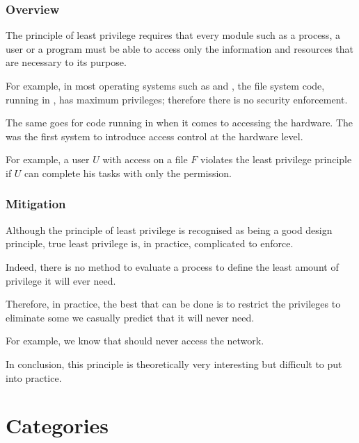 \begin{frame}
  \frametitle{Overview}

  The principle of least privilege requires that every module such as a
  process, a user or a program must be able to access only the information
  and resources that are necessary to its purpose.

  \-

  For example, in most operating systems such as  and
  , the file system code, running in , has
  maximum privileges; therefore there is no security enforcement.

  \-

  The same goes for code running in  when it comes to
  accessing the hardware. The  was the first system
  to introduce access control at the hardware level.

  \-

  For example, a user $U$ with  access on a file
  $F$ violates the least privilege principle if $U$ can complete his
  tasks with only the  permission.
\end{frame}


\begin{frame}
  \frametitle{Mitigation}

  Although the principle of least privilege is recognised as being a
  good design principle, true least privilege is, in practice, complicated
  to enforce.

  \-

  Indeed, there is no method to evaluate a process to define the least
  amount of privilege it will ever need.

  \-

  Therefore, in practice, the best that can be done is to restrict the
  privileges to eliminate some we casually predict that it will never need.

  \-

  For example, we know that  should never access the network.

  \-

  In conclusion, this principle is theoretically very interesting but
  difficult to put into practice.
\end{frame}

%
%

\section{Categories}

